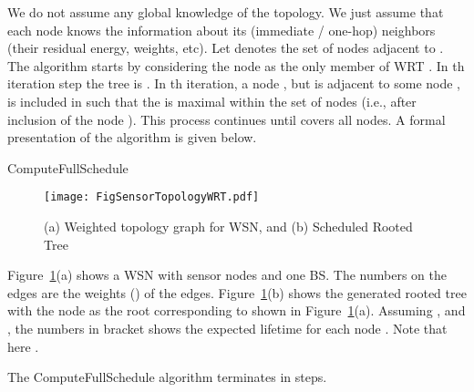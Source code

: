 \documentclass[10pt]{llncs}
\begin{document}
We do not assume any global knowledge of the topology. We just assume that each node knows the information about its (immediate / one-hop) neighbors (their residual energy, weights, etc). Let  denotes the set of nodes adjacent to . The algorithm starts by considering the node  as the only member of WRT . In th iteration step the tree is . In th iteration, a node , but is adjacent to some node , is included in  such that the  is maximal within the set of nodes  (i.e., after inclusion of the node ). This process continues until  covers all  nodes. A formal presentation of the algorithm is given below.

\begin{algorithm}[htb]
\begin{algorithmic}
	\STATE{}
	\STATE{}
	\IF{}
	\ENDIF
	\ENDIF
\ENDFOR
{}
	\ELSE
	\ENDIF
\ENDFOR
\STATE{}
\ENDIF
{}
\end{algorithmic}
\caption{ComputeFullSchedule} \label{algo:ComputeFullSchedule}
\end{algorithm}

\begin{figure}[!ht]
\centerline{\texttt{[image: FigSensorTopologyWRT.pdf]}}
\caption{(a) Weighted topology graph for WSN, and (b) Scheduled Rooted Tree}
\label{fig:sensor:wrt}
\end{figure}

Figure~\ref{fig:sensor:wrt}(a) shows a WSN with  sensor nodes and one BS. The numbers on the edges are the weights () of the edges. Figure~\ref{fig:sensor:wrt}(b) shows the generated rooted tree  with the node  as the root corresponding to  shown in Figure~\ref{fig:sensor:wrt}(a). Assuming , and , the numbers in bracket shows the expected lifetime  for each node . Note that here .

\begin{theorem}
The ComputeFullSchedule algorithm terminates in  steps.
\end{theorem}
\end{document}
